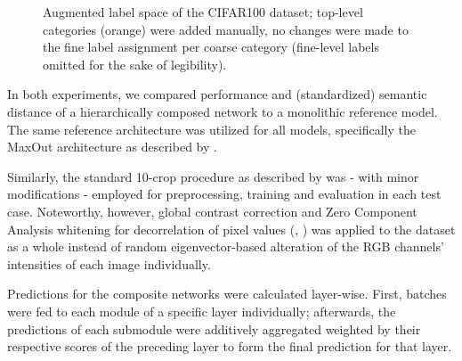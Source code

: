 \documentclass[conference]{IEEEtran}
\begin{document}
\begin{figure}[tb]
{\begin{minipage}{\textwidth}
    \vspace{\baselineskip}

    \vspace{\baselineskip}
    \end{minipage}
    }
    \caption{Augmented label space of the CIFAR100 dataset; top-level categories (orange) were added manually, no changes were made to the fine label assignment per coarse category (fine-level labels omitted for the sake of legibility).}
    \label{fig:experiments_cifar100_label_space}
\end{figure}

In both experiments, we compared performance and (standardized) semantic distance of a hierarchically composed network to a monolithic reference model. The same reference architecture was utilized for all models, specifically the MaxOut architecture as described by \cite{Goodfellow2013-za}.

Similarly, the standard 10-crop procedure as described by \cite{Krizhevsky2012-jr} was - with minor modifications - employed for preprocessing, training and evaluation in each test case. Noteworthy, however, global contrast correction and Zero Component Analysis whitening for decorrelation of pixel values (\cite{Krizhevsky2009-wt}, \cite{Goodfellow2013-za}) was applied to the dataset as a whole instead of random eigenvector-based alteration of the RGB channels' intensities of each image individually.

Predictions for the composite networks were calculated layer-wise. First, batches were fed to each module of a specific layer individually; afterwards, the predictions of each submodule were additively aggregated weighted by their respective scores of the preceding layer to form the final prediction for that layer.
\end{document}
